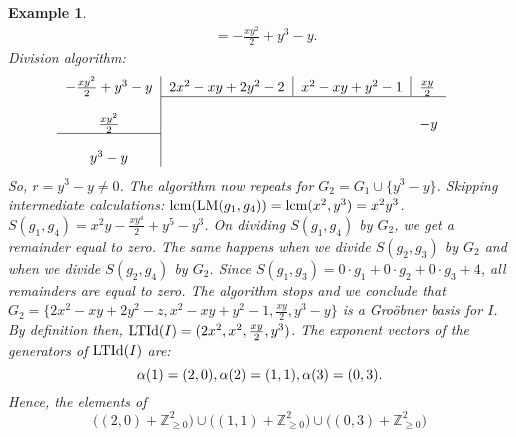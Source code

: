 \documentclass[a4paper,12pt]{article}
\newtheorem{example}[theorem]{Example}
\newcommand{\ZZ}{\mathbb{Z}}
\newcommand{\LM }{{\rm LM}}
\newcommand{\LTId }{{\rm LTId}}
\DeclareMathOperator{\lcm}{lcm}
\begin{document}
\begin{example}
\begin{equation*}
\begin{split}
	& = - \frac{xy^2}{2} + y^3 - y.
	\end{split}
\end{equation*}
Division algorithm:
\[
\begin{tabular}{c|llll}
\multicolumn{1}{l|}{$ -\frac{xy^2}{2} + y^3 - y $} & \multicolumn{1}{l|}{$ 2x^2-xy+2y^2-2$} & \multicolumn{1}{l|}{$ x^2-xy+y^2-1 $} & $ \frac{xy}{2}$ & \\ \cline{2-4} \\
$ \frac{xy^2}{2} $ & & & $ -y $ & \\ \cline{1-1} \\
$ y^3-y $ & & & &  \\
\end{tabular}
\]
So, $r = y^3-y \neq 0$. The algorithm now repeats for $G_2 = G_1 \cup \{y^3-y\}$.
Skipping intermediate calculations: $\lcm(\LM(g_1, g_4)) = \lcm(x^2, y^3) = x^2y^3$.
$S(g_1, g_4) = x^2y - \frac{xy^4}{2}+ y^5 - y^3$. On dividing $S(g_1, g_4)$ by $G_2$, we get a remainder equal to zero. The same happens when we divide $S(g_2, g_3)$ by $G_2$ and when we divide $S(g_2, g_4)$ by $G_2$. Since $S(g_1, g_3) = 0\cdot g_1 + 0 \cdot g_2 + 0 \cdot g_3 + 4$, all remainders are equal to zero. The algorithm stops and we conclude that $G_2 = \{2x^2-xy+2y^2-z, x^2-xy+y^2-1, \frac{xy}{2}, y^3-y \}$ is a Gro\"obner basis for $I$. By definition then, $\LTId(I) = (2x^2, x^2, \frac{xy}{2}, y^3)$. The exponent vectors of the generators of $\LTId(I)$ are:
	\begin{equation*}
	\alpha(1) = (2,0),\\
	\alpha(2) = (1,1),\\
	\alpha(3) = (0,3).
	\end{equation*}
	Hence, the elements of 
	$$ \big( (2,0) + \ZZ_{\geq 0}^2 \big) \cup \big((1,1) + \ZZ_{\geq 0}^2\big) \cup \big((0,3)+ \ZZ_{\geq 0}^2\big) $$
	

\end{example}
\end{document}
